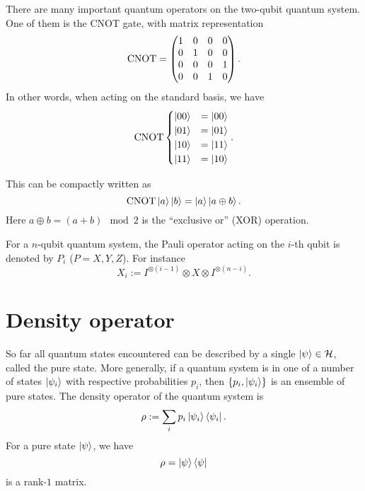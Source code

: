 \begin{exam}
There are many important quantum operators on the two-qubit quantum system. One of them is the CNOT gate, with matrix representation
\begin{equation}
\operatorname{CNOT}=\begin{pmatrix}
{1} & {0} & {0} & {0} \\ 
{0} & {1} & {0} & {0} \\ 
{0} & {0} & {0} & {1} \\ 
{0} & {0} & {1} & {0}
\end{pmatrix}.
\end{equation}
In other words, when acting on the standard basis, we have
\begin{equation}
\operatorname{CNOT}\begin{cases}
\ket{00}&=\ket{00}\\
\ket{01}&=\ket{01}\\
\ket{10}&=\ket{11}\\
\ket{11}&=\ket{10}\\
\end{cases}.
\end{equation}

This can be compactly written as
\begin{equation}
\operatorname{CNOT}\ket{a}\ket{b}=\ket{a}\ket{a\oplus b}.
\end{equation}
Here $a\oplus b=(a+b)\mod 2$ is the ``exclusive or'' (XOR) operation.
\end{exam}

\begin{exam}
For a $n$-qubit quantum system, the Pauli operator acting on the $i$-th qubit is denoted by $P_i$ ($P=X,Y,Z$). For instance
\begin{equation}
X_i:=I^{\otimes (i-1)}\otimes X\otimes I^{\otimes (n-i)}.
\end{equation} 
\end{exam}

\section{Density operator}

So far all quantum states encountered can be described by a single $\ket{\psi}\in\mathcal{H}$, called the pure state. More generally, if a quantum system is in one of a number of states $\ket{\psi_i}$ with respective probabilities $p_i$, then $\{p_i, \ket{\psi_i}\}$ is an ensemble of pure states. The density operator of the quantum system is 
\begin{equation}
\rho:=\sum_i p_i \ket{\psi_i}\bra{\psi_i}.
\end{equation}
For a pure state $\ket{\psi}$, we have
\begin{equation}
\rho=\ket{\psi}\bra{\psi}
\end{equation}
is a rank-$1$ matrix.

